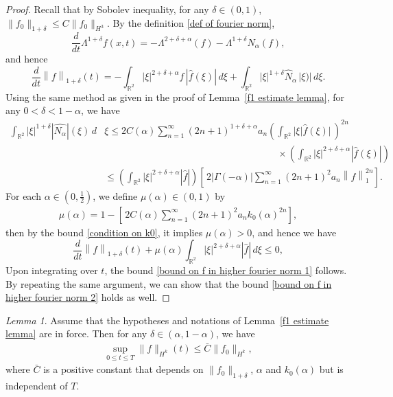 \documentclass[reqno]{amsart}%
\theoremstyle{definition}
\theoremstyle{remark}
\numberwithin{equation}{section}
\newtheorem{lemma}[theorem]{Lemma}
\newcommand{\0}{\mathbf{0}}
\newcommand{\1}{\mathbf{1}}
\numberwithin{equation}{section}
\numberwithin{theorem}{section}
\numberwithin{figure}{section}
\begin{document}
\begin{proof}
Recall that by Sobolev inequality, for any $\delta\in(0,1)$, $\|f_0\|_{1+\delta}\le C\|f_0\|_{H^3}$. By the definition \eqref{def of fourier norm},
\begin{equation*}
\frac{d}{dt} \Lambda^{1+\delta}f(x,t) = - \Lambda^{2+\delta + \alpha} (f) - \Lambda^{1+\delta}N_\alpha (f),
 \end{equation*}
and hence
 \begin{equation*}
\frac{d}{dt} \left\|f\right\|_{ 1+\delta   } (t) = - \int_{\mathbb{R}^2} |\xi|^{2+\delta+\alpha} f \, |\hat{f}(\xi)| \, d\xi
+ \int_{\mathbb{R}^2} |\xi|^{1+\delta} \hat{N}_{\alpha} \, | \xi)| \, d\xi.
\end{equation*}
Using the same method as given in the proof of Lemma~\ref{f1 estimate lemma}, for any $0<\delta<1-\alpha$, we have
\begin{align*}
\int_{\mathbb{R}^2} |\xi|^{1+\delta } |\hat{N_{\alpha}}|(\xi)\, d&\xi \leq 2C(\alpha) \sum_{n=1}^{\infty}  (2n+1)^{1+\delta+\alpha} a_n \left( \int_{ \mathbb{R}^2}   |\xi| \hat{f}(\xi)| \,\right)^{2n} \\
&\qquad\qquad\qquad\qquad\qquad\qquad\qquad\qquad\qquad\times \left( \int_{ \mathbb{R}^2}   |\xi|^{2+\delta+\alpha} |\hat{f}(\xi)|  \right)\\
&\leq \left(\int_{ \mathbb{R}^2}   |\xi|^{2+\delta+\alpha} |\hat{f}|  \right)  \left[ \, 2{|\Gamma {(- \alpha)}|} \sum_{n=1}^{\infty} (2n+1)^2 { a_n } \left\|f\right\|_1^{2n} \right].
\end{align*}
For each $\alpha\in(0,\frac{1}{2})$, we define $\mu(\alpha)\in(0,1)$ by
\begin{align*}
\mu(\alpha)=1-\left[ \, 2C(\alpha) \sum_{n=1}^{\infty} (2n+1)^2 { a_n } k_0(\alpha)^{2n} \right],
\end{align*}
then by the bound \eqref{condition on k0}, it implies $\mu(\alpha)>0$, and hence we have
\begin{equation*}
\frac{d}{dt} \left\|f\right\|_{ {1+\delta}}(t) + \mu(\alpha)\int_{ \mathbb{R}^2}   |\xi|^{2+\delta+\alpha} |\hat{f}|   \, d\xi\leq 0,
\end{equation*}
Upon integrating over $t$, the bound \eqref{bound on f in higher fourier norm 1} follows. By repeating the same argument, we can show that the bound \eqref{bound on f in higher fourier norm 2} holds as well.
\end{proof}
\begin{lemma}\label{H3+ estimate lemma}
Assume that the hypotheses and notations of Lemma~\ref{f1 estimate lemma} are in force. Then for any $\delta\in(\alpha,1-\alpha)$, we have
\begin{align}\label{bound on f in higher Hk norm}
\sup_{0\le t\le T}\|f\|_{H^{k}}(t)\le \bar{C}\|f_0\|_{H^{k}},
\end{align}
where $\bar{C}$ is a positive constant that depends on $\|f_0\|_{1+\delta}$, $\alpha$ and $k_0(\alpha)$ but is independent of $T$.
\end{lemma}
\end{document}
